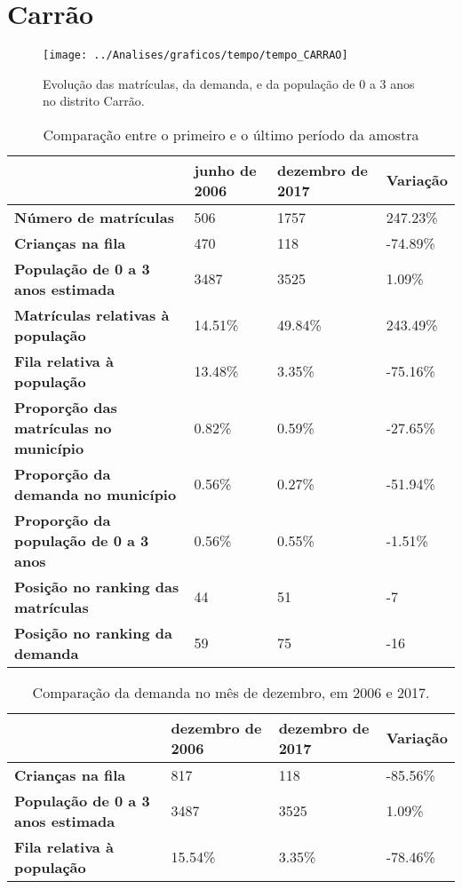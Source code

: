 \section{Carrão}
\begin{figure}[H]
\centering
\texttt{[image: ../Analises/graficos/tempo/tempo\_CARRAO]}
\caption{Evolução das matrículas, da demanda, e da população de 0 a 3 anos no distrito Carrão.}
\end{figure}
\begin{table}[H]
\begin{tabular}{|l|l|l|l|}
\hline
\textbf{}                                      & \textbf{junho de 2006}       & \textbf{dezembro de 2017}    & \textbf{Variação} \\ \hline
\textbf{Número de matrículas}                  & 506 & 1757 & 247.23\% \\ \hline
\textbf{Crianças na fila}                      & 470 & 118 & -74.89\% \\ \hline
\textbf{População de 0 a 3 anos estimada}      & 3487 & 3525 & 1.09\% \\ \hline
\textbf{Matrículas relativas à população}      & 14.51\% & 49.84\% & 243.49\% \\ \hline
\textbf{Fila relativa à população}             & 13.48\% & 3.35\% & -75.16\% \\ \hline
\textbf{Proporção das matrículas no município} & 0.82\% & 0.59\% & -27.65\% \\ \hline
\textbf{Proporção da demanda no município}     & 0.56\% & 0.27\% & -51.94\% \\ \hline
\textbf{Proporção da população de 0 a 3 anos}  & 0.56\% & 0.55\% & -1.51\% \\ \hline
\textbf{Posição no ranking das matrículas}     & 44 & 51 & -7 \\ \hline
\textbf{Posição no ranking da demanda}         & 59 & 75 & -16 \\ \hline
\end{tabular}
\caption{Comparação entre o primeiro e o último período da amostra}
\end{table}
\begin{table}[H]
\begin{tabular}{|l|l|l|l|}
\hline
\textbf{}                                 & \textbf{dezembro de 2006} & \textbf{dezembro de 2017} & \textbf{Variação} \\ \hline
\textbf{Crianças na fila}                      & 817 & 118 & -85.56\% \\ \hline
\textbf{População de 0 a 3 anos estimada}      & 3487 & 3525 & 1.09\% \\ \hline
\textbf{Fila relativa à população}             & 15.54\% & 3.35\% & -78.46\% \\ \hline
\end{tabular}
\caption{Comparação da demanda no mês de dezembro, em 2006 e 2017.}
\end{table}
